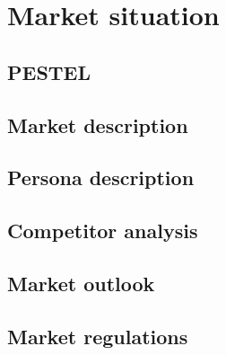 \chapter{Market situation} \label{market-situation}
\section{PESTEL}
\section{Market description}
\section{Persona description}
\section{Competitor analysis}
\section{Market outlook}
\section{Market regulations}

